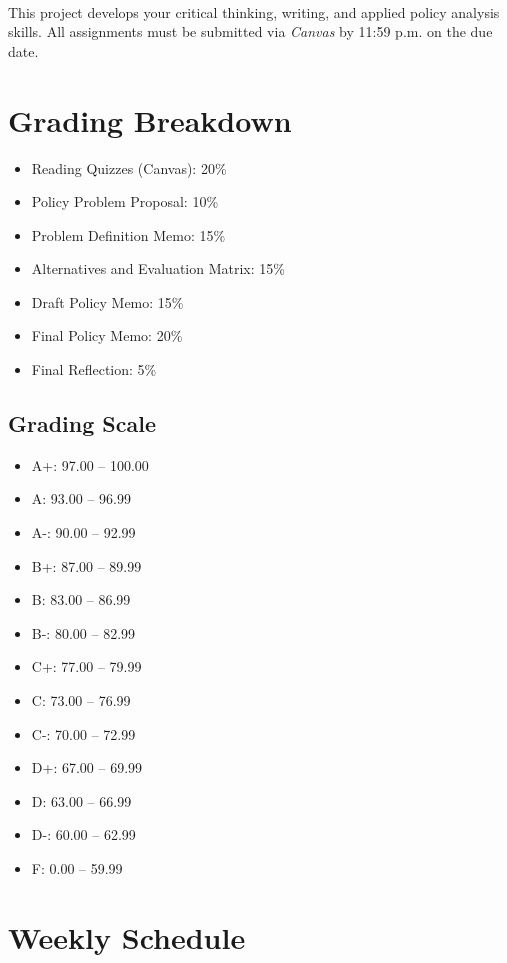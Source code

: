 \documentclass[11pt, letterpaper]{article}
\begin{document}
\paragraph{} This project develops your critical thinking, writing, and applied policy analysis skills. All assignments must be submitted via \emph{Canvas} by 11:59 p.m. on the due date.


\section{Grading Breakdown}
\begin{itemize}
  \item Reading Quizzes (Canvas): 20\%
  \item Policy Problem Proposal: 10\%
  \item Problem Definition Memo: 15\%
  \item Alternatives and Evaluation Matrix: 15\%
  \item Draft Policy Memo: 15\%
  \item Final Policy Memo: 20\%
  \item Final Reflection: 5\%
\end{itemize}

\subsection*{Grading Scale}

\begin{itemize}
    \item A+: 97.00 -- 100.00
    \item A: 93.00 -- 96.99
    \item A-: 90.00 -- 92.99
    \item B+: 87.00 -- 89.99
    \item B: 83.00 -- 86.99
    \item B-: 80.00 -- 82.99
    \item C+: 77.00 -- 79.99
    \item C: 73.00 -- 76.99
    \item C-: 70.00 -- 72.99
    \item D+: 67.00 -- 69.99
    \item D: 63.00 -- 66.99
    \item D-: 60.00 -- 62.99
    \item F: 0.00 -- 59.99
\end{itemize}

\section*{Weekly Schedule}
\end{document}
